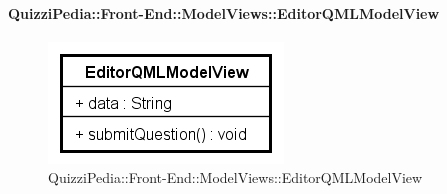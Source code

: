 \paragraph{QuizziPedia::Front-End::ModelViews::EditorQMLModelView}
\begin{figure} [ht]
	\centering
	\includegraphics[scale=0.80]{UML/Classi/Front-End/QuizziPedia_Front-end_Views_EditorQMLModelView.png}
	\caption{QuizziPedia::Front-End::ModelViews::EditorQMLModelView}
\end{figure} \FloatBarrier
